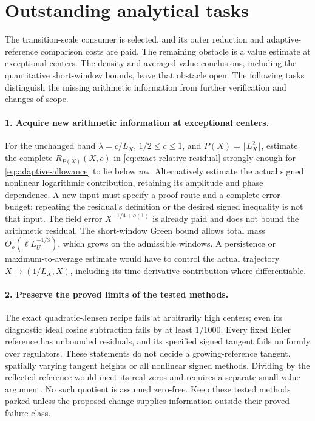 \section{Outstanding analytical tasks}\label{sec:outstanding}

The transition-scale consumer is selected, and its outer reduction and
adaptive-reference comparison costs are paid. The remaining obstacle is
a value estimate at exceptional centers. The density and averaged-value
conclusions, including the quantitative short-window bounds, leave
that obstacle open. The following tasks distinguish
the missing arithmetic information from further verification and changes
of scope.

\paragraph{1. Acquire new arithmetic information at exceptional centers.}
For the unchanged band \(\lambda=c/L_X\), \(1/2\le c\le1\), and
\(P(X)=\lfloor L_X^2\rfloor\), estimate the complete
\(R_{P(X)}(X,c)\) in \eqref{eq:exact-relative-residual} strongly
enough for \eqref{eq:adaptive-allowance} to lie below \(m_*\).
Alternatively estimate the actual signed nonlinear logarithmic
contribution, retaining its amplitude and phase dependence. A new input
must specify a proof route and a complete error budget; repeating the
residual's definition or the desired signed inequality is not that input.
The field error \(X^{-1/4+o(1)}\) is already paid and does not bound
the arithmetic residual. The short-window Green bound allows total
mass \(O_\rho(\ell L_U^{-1/3})\), which grows on the admissible
windows. A persistence or maximum-to-average estimate would have to
control the actual trajectory \(X\mapsto(1/L_X,X)\), including its
time derivative contribution where differentiable.

\paragraph{2. Preserve the proved limits of the tested methods.}
The exact quadratic-Jensen recipe fails at arbitrarily high centers;
even its diagnostic ideal cosine subtraction fails by at least
\(1/1000\). Every fixed Euler reference has unbounded residuals,
and its specified signed tangent fails uniformly over regulators.
These statements do not decide a growing-reference tangent, spatially
varying tangent heights or all nonlinear signed methods. Dividing by
the reflected reference would meet its real zeros and requires a
separate small-value argument. No such quotient is assumed zero-free.
Keep these tested methods parked unless the proposed change supplies
information outside their proved failure class.

